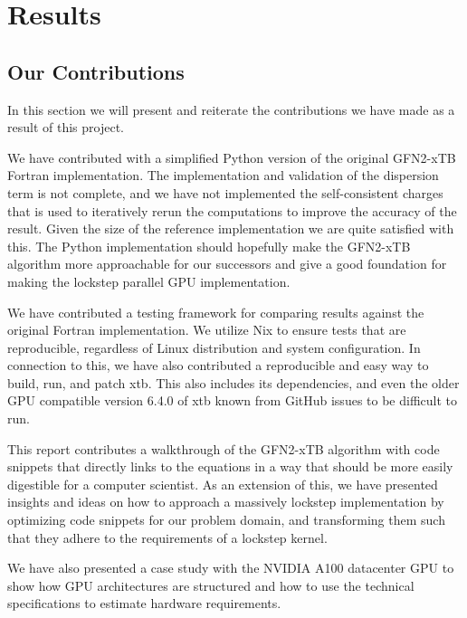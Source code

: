 \chapter{Results}

\section{Our Contributions}

In this section we will present and reiterate the contributions we have made as a result of this project.

We have contributed with a simplified Python version of the original GFN2-xTB Fortran implementation. The implementation and validation of the dispersion term is not complete, and we have not implemented the self-consistent charges that is used to iteratively rerun the computations to improve the accuracy of the result. Given the size of the reference implementation we are quite satisfied with this. The Python implementation should hopefully make the GFN2-xTB algorithm more approachable for our successors and give a good foundation for making the lockstep parallel GPU implementation.

We have contributed a testing framework for comparing results against the original Fortran implementation. We utilize Nix to ensure tests that are reproducible, regardless of Linux distribution and system configuration. In connection to this, we have also contributed a reproducible and easy way to build, run, and patch xtb. This also includes its dependencies, and even the older GPU compatible version 6.4.0 of xtb known from GitHub issues to be difficult to run.

This report contributes a walkthrough of the GFN2-xTB algorithm with code snippets that directly links to the equations in a way that should be more easily digestible for a computer scientist. As an extension of this, we have presented insights and ideas on how to approach a massively lockstep implementation by optimizing code snippets for our problem domain, and transforming them such that they adhere to the requirements of a lockstep kernel.

We have also presented a case study with the NVIDIA A100 datacenter GPU to show how GPU architectures are structured and how to use the technical specifications to estimate hardware requirements.



